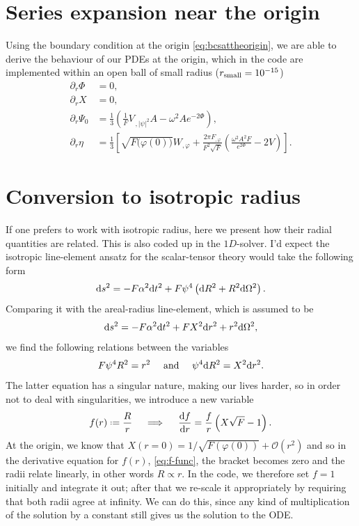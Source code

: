 \documentclass[12pt]{article}
\numberwithin{equation}{section}
\newcommand*{\defeq}{\mathrel{\vcenter{\baselineskip0.5ex \lineskiplimit0pt
                     \hbox{\scriptsize.}\hbox{\scriptsize.}}}%
                     =}
\begin{document}
\section{Series expansion near the origin}
Using the boundary condition at the origin \eqref{eq:bcsattheorigin}, we are able to derive the behaviour of our PDEs at the origin, which in the code are implemented within an open ball of small radius ($r_{\rm{small}} = 10^{-15}$)
\begin{align}
    \partial_r \Phi &= 0, \\
    \partial_r X & = 0, \\
    \partial_r \Psi_0 &= \frac{1}{3} \left(\frac{1}{F} V_{\,,|\psi|^2} A - \omega^2 A e^{-2 \Phi} \right), \\
    \partial_r \eta & = \frac{1}{3} \left[\sqrt{F({\varphi(0))}} W_{, \varphi} + \frac{2 \pi F_{, \varphi}}{F^2 \sqrt{F}}
     \left(\frac{\omega^2 A^2 F}{e^{2 \Phi}} - 2V \right) \right].
\end{align}

\section{Conversion to isotropic radius}
If one prefers to work with isotropic radius, here we present how their radial quantities are related. This is also coded up in the $1D$-solver. I'd expect the isotropic line-element ansatz for the scalar-tensor theory would take the following form
\begin{equation} \label{eq:iso_line}
    {\rm d}s^2 = -F \alpha^2 {\rm d}t^2 + F \psi^4 \left({\rm d}R^2 +R^2 {\rm d}\Omega^2 \right).
\end{equation}
Comparing it with the areal-radius line-element, which is assumed to be
\begin{equation} \label{eq:areal_line}
    {\rm d}s^2 = -F \alpha^2 {\rm d}t^2 + F X^2 {\rm d}r^2 +r^2 {\rm d}\Omega^2,
\end{equation}
we find the following relations between the variables
\begin{equation}
    F \psi^4 R^2 = r^2 \quad \text{ and } \quad  \psi^4 {\rm d}R^2 = X^2 {\rm d}r^2.
\end{equation}
The latter equation has a singular nature, making our lives harder, so in order not to deal with singularities, we introduce a new variable
\begin{equation} \label{eq:f-func}
    f(r) \defeq \frac{R}{r} \quad \implies \quad \frac{{\rm d}f}{{\rm d}r} = \frac{f}{r}\left(X\sqrt{F}-1\right).
\end{equation}
At the origin, we know that $X(r = 0) = 1/\sqrt{F(\varphi(0))} + \mathcal{O}(r^2)$ and so in the derivative equation for $f(r)$, \eqref{eq:f-func}, the bracket becomes zero and the radii relate linearly, in other words $R \propto r$. In the code, we therefore set $f=1$ initially and integrate it out; after that we re-scale it appropriately by requiring that both radii agree at infinity. We can do this, since any kind of multiplication of the solution by a constant still gives us the solution to the ODE.
\end{document}
